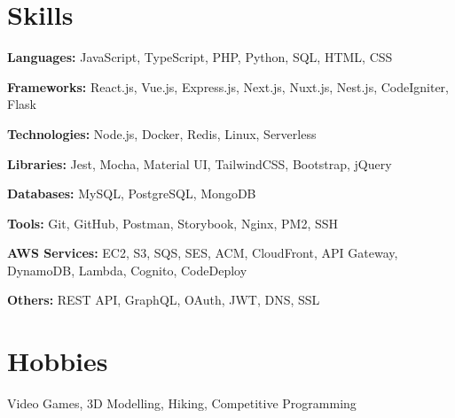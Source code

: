 \documentclass[letterpaper,12pt]{article}
\newcommand{\resumeSubHeadingListStart}{\begin{itemize}[leftmargin=0.15in, label={}]}
\newcommand{\resumeSubHeadingListEnd}{\end{itemize}}
\begin{document}
\section{Skills}
\vspace{2pt}
\resumeSubHeadingListStart
\small{\item{

                \textbf{Languages:}{ JavaScript, TypeScript, PHP, Python, SQL, HTML, CSS} \\ \vspace{3pt}

                \textbf{Frameworks:}{ React.js, Vue.js, Express.js, Next.js, Nuxt.js, Nest.js, CodeIgniter, Flask} \\ \vspace{3pt}

                \textbf{Technologies:}{ Node.js, Docker, Redis, Linux, Serverless} \\ \vspace{3pt}

                \textbf{Libraries:}{ Jest, Mocha, Material UI, TailwindCSS, Bootstrap, jQuery} \\ \vspace{3pt}

                \textbf{Databases:}{ MySQL, PostgreSQL, MongoDB} \\ \vspace{3pt}

                \textbf{Tools:}{ Git, GitHub, Postman, Storybook, Nginx, PM2, SSH} \\ \vspace{3pt}

                \textbf{AWS Services:}{ EC2, S3, SQS, SES, ACM, CloudFront, API Gateway, DynamoDB, Lambda, Cognito, CodeDeploy} \\ \vspace{3pt}

                \textbf{Others:}{ REST API, GraphQL, OAuth, JWT, DNS, SSL} \\ \vspace{3pt}

          }}
\resumeSubHeadingListEnd


\section{Hobbies}
\resumeSubHeadingListStart
\small{\item{Video Games, 3D Modelling, Hiking, Competitive Programming }}
\resumeSubHeadingListEnd

\end{document}
